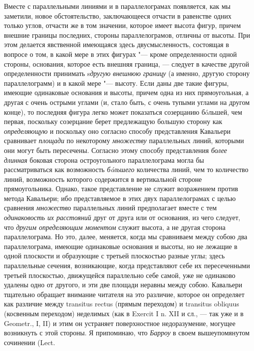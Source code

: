 Вместе с параллельными линиями и в параллелограмах появляется, как мы
заметили, новое обстоятельство, заключающееся отчасти в равенстве одних
только углов, отчасти же в том значении, которое имеет высота фигур, причем
внешние границы последних, стороны параллелограмов, отличны от высоты. При
этом делается явственной имеющаяся здесь двусмысленность, состоящая в
вопросе о том, в какой мере в этих фигурах "--- кроме определенности одной
стороны, основания, которое есть внешняя граница, — следует в качестве
другой определенности принимать s{\em другую внешнюю
границу} (а именно, другую сторону параллелограмм) и в какой мере "--- высоту.
Если даны две такие фигуры, имеющие одинаковые основания и высоты, причем
одна из них прямоугольная, а другая с очень острыми углами (и, стало быть,
с очень тупыми углами на другом конце), то последняя фигура легко может
показаться созерцанию бóльшей, чем первая, поскольку созерцание берет
предлежащую большую сторону как {\em определяющую} и
поскольку оно согласно способу представления Кавальери сравнивает
{\em площади} по некоторому
{\em множеству} параллельных линий, которыми они могут
быть пересечены. Согласно этому способу представления
{\em более длинная} боковая сторона остроугольного
параллелограма могла бы рассматриваться как возможность
{\em бóльшего} количества линий, чем то количество
линий, возможность которого содержится в вертикальной стороне
прямоугольника. Однако, такое представление не служит возражением против
метода Кавальери; ибо представляемое в этих двух параллелограмах с целью
сравнения {\em множество} параллельных линий
предполагает вместе с тем {\em одинаковость их
расстояний} друг от друга или от основания, из чего следует, что
{\em другим определяющим моментом} служит высота, а не
другая сторона параллелограма. Но это, далее, меняется, когда мы сравниваем
между собою два параллелограма, имеющие одинаковые основания и высоты, но
не лежащие в одной плоскости и образующие с третьей плоскостью разные углы;
здесь параллельные сечения, возникающие, когда представляют себе их
пересеченными третьей плоскостью, движущейся параллельно себе самой, уже не
одинаково удалены одно от другого, и эти две площади неравны между собою.
Кавальери тщательно обращает внимание читателя на это различие, которое он
определяет как различие между transitus rectus (прямым переходом) и
transitus obliquus (косвенным переходом) неделимых (как в Exercit I n. XII
и сл., — так уже и в Geometr., I, II) и этим он устраняет поверхностное
недоразумение, могущее возникнуть с этой стороны. Я припоминаю, что
{\em Барроу} в своем вышеупомянутом сочинении (Lect.
